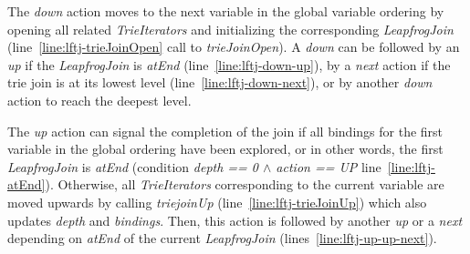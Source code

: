 The \textit{down} action moves to the next variable in the global variable ordering by opening all related \textit{TrieIterators}
and initializing the corresponding \textit{LeapfrogJoin} (line~\ref{line:lftj-trieJoinOpen} call to \textit{trieJoinOpen}).
A \textit{down} can be followed by an \textit{up} if the \textit{LeapfrogJoin} is \textit{atEnd} (line~\ref{line:lftj-down-up}),
by a \textit{next} action if the trie join is at its lowest level (line~\ref{line:lftj-down-next}), or by another \textit{down} action to
reach the deepest level.

The \textit{up} action can signal the completion of the join if all bindings for the first variable in the global ordering have
been explored, or in other words, the first \textit{LeapfrogJoin} is \textit{atEnd} (condition
\textit{depth == 0 $\wedge$ action ==  UP} line~\ref{line:lftj-atEnd}).
Otherwise, all \textit{TrieIterators} corresponding to the current variable are moved upwards by calling \textit{triejoinUp}
(line~\ref{line:lftj-trieJoinUp}) which also updates \textit{depth} and \textit{bindings}.
Then, this action is followed by another \textit{up} or a \textit{next} depending on \textit{atEnd} of the current \textit{LeapfrogJoin}
(lines~\ref{line:lftj-up-up-next}).

